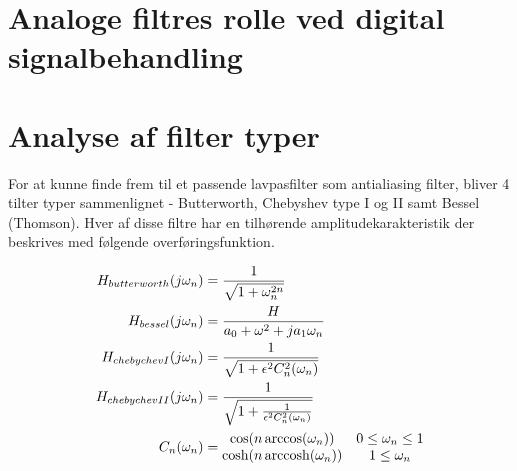 

\section{Analoge filtres rolle ved digital signalbehandling}\label{sec:filter_intro}

\section{Analyse af filter typer}\label{sec:filter_analyse}
For at kunne finde frem til et passende lavpasfilter som antialiasing filter, bliver 4 tilter typer sammenlignet - Butterworth, Chebyshev type I og II samt Bessel (Thomson).
Hver af disse filtre har en tilhørende amplitudekarakteristik der beskrives med følgende overføringsfunktion\cite{anfilter}.

\begin{align} 
H_{butterworth}(j\omega_n) &= \frac{1}{\sqrt{1 + \omega_n^{2n}}} \label{eq:H_butt} \\
H_{bessel} (j\omega_n) &= \frac{H}{a_0 + \omega^2 + ja_1\omega_n} \label{eq:H_bes}\\
H_{chebychevI}(j\omega_n) &= \frac{1}{\sqrt{1 + \epsilon^2 C_n^2(\omega_n)}} \label{eq:H_cheb1} \\
H_{chebychevII}(j\omega_n) &= \frac{1}{\sqrt{1 + \frac{1}{\epsilon^2 C_n^2(\omega_n)}}} \label{eq:H_cheb2} \\
C_n(\omega_n) &=  
\begin{matrix}
	\cos(n\arccos(\omega_n)) & 0 \le \omega_n \le 1 \\  \cosh(n \operatorname{arccosh}(\omega_n)) & 1 \le \omega_n 
\end{matrix} \label{eq:chev_cn_funk}
\end{align}

